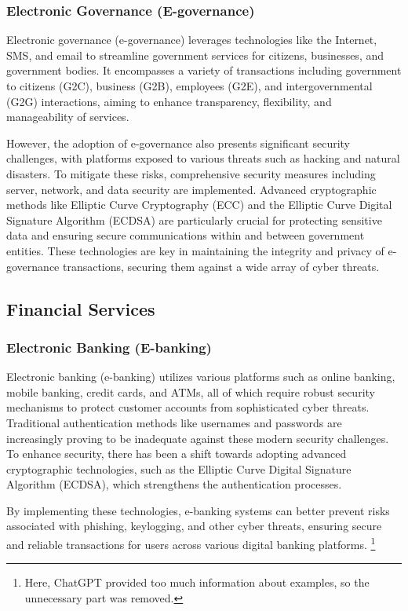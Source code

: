 \subsubsection{Electronic Governance (E-governance)}

Electronic governance (e-governance) leverages technologies like the Internet, SMS, and email to streamline government services for citizens, businesses, and government bodies. It encompasses a variety of transactions including government to citizens (G2C), business (G2B), employees (G2E), and intergovernmental (G2G) interactions, aiming to enhance transparency, flexibility, and manageability of services.

However, the adoption of e-governance also presents significant security challenges, with platforms exposed to various threats such as hacking and natural disasters. To mitigate these risks, comprehensive security measures including server, network, and data security are implemented. Advanced cryptographic methods like Elliptic Curve Cryptography (ECC) and the Elliptic Curve Digital Signature Algorithm (ECDSA) are particularly crucial for protecting sensitive data and ensuring secure communications within and between government entities. These technologies are key in maintaining the integrity and privacy of e-governance transactions, securing them against a wide array of cyber threats.

\subsection{Financial Services}

\subsubsection{Electronic Banking (E-banking)}

Electronic banking (e-banking) utilizes various platforms such as online banking, mobile banking, credit cards, and ATMs, all of which require robust security mechanisms to protect customer accounts from sophisticated cyber threats. Traditional authentication methods like usernames and passwords are increasingly proving to be inadequate against these modern security challenges. To enhance security, there has been a shift towards adopting advanced cryptographic technologies, such as the Elliptic Curve Digital Signature Algorithm (ECDSA), which strengthens the authentication processes.

By implementing these technologies, e-banking systems can better prevent risks associated with phishing, keylogging, and other cyber threats, ensuring secure and reliable transactions for users across various digital banking platforms. \footnote{Here, ChatGPT provided too much information about examples, so the unnecessary part was removed.}


